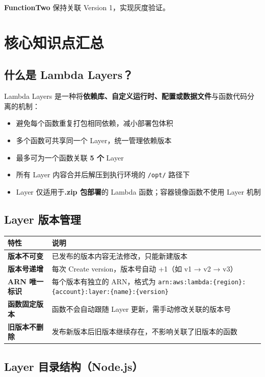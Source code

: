 \documentclass[12pt, a4paper]{article}
\begin{document}
\textbf{FunctionTwo} 保持关联 Version 1，实现灰度验证。

\section{核心知识点汇总}

\subsection{什么是 Lambda Layers？}

Lambda Layers 是一种将\textbf{依赖库、自定义运行时、配置或数据文件}与函数代码分离的机制：

\begin{itemize}
  \item 避免每个函数重复打包相同依赖，减小部署包体积
  \item 多个函数可共享同一个 Layer，统一管理依赖版本
  \item 最多可为一个函数关联 \textbf{5 个} Layer
  \item 所有 Layer 内容合并后解压到执行环境的 \texttt{/opt/} 路径下
  \item Layer 仅适用于\textbf{.zip 包部署}的 Lambda 函数；容器镜像函数不使用 Layer 机制
\end{itemize}

\subsection{Layer 版本管理}

\begin{center}
\begin{tabular}{>{\bfseries}p{3.5cm} p{9cm}}
\toprule
特性 & 说明 \\
\midrule
版本不可变 & 已发布的版本内容无法修改，只能新建版本 \\
版本号递增 & 每次 Create version，版本号自动 +1（如 v1 → v2 → v3） \\
ARN 唯一标识 & 每个版本有独立的 ARN，格式为 \texttt{arn:aws:lambda:\{region\}:\{account\}:layer:\{name\}:\{version\}} \\
函数固定版本 & 函数不会自动跟随 Layer 更新，需手动修改关联的版本号 \\
旧版本不删除 & 发布新版本后旧版本继续存在，不影响关联了旧版本的函数 \\
\bottomrule
\end{tabular}
\end{center}

\subsection{Layer 目录结构（Node.js）}
\end{document}

